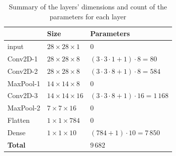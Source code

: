 \documentclass[compsoc]{IEEEtran}
\begin{document}
\begin{table}[ht!]
\begin{tabular}{|ll|l|}
\hline
\rowcolor[HTML]{3166FF} 
\multicolumn{1}{|l|}{\cellcolor[HTML]{3166FF}{\color[HTML]{FFFFFF} \textbf{Layer}}} & {\color[HTML]{FFFFFF} \textbf{Size}} & {\color[HTML]{FFFFFF} \textbf{Parameters}} \\ \hline
\multicolumn{1}{|l|}{input}                                                         & $28\times28\times1$                          &   $0$                                             \\ \hline
\multicolumn{1}{|l|}{Conv2D-1}                                                      & $28\times28\times8$                           &  $(3\cdot3\cdot1+1)\cdot8 = 80$                                            \\ \hline
\multicolumn{1}{|l|}{Conv2D-2}                                                      & $28\times28\times8$                            &  $(3\cdot3\cdot8 + 1)\cdot8 = 584$                                            \\ \hline
\multicolumn{1}{|l|}{MaxPool-1}                                                     & $14\times14\times8$                            &  $0$                                            \\ \hline
\multicolumn{1}{|l|}{Conv2D-3}                                                      & $14\times14\times16$                            & $(3\cdot3\cdot8 + 1)\cdot16 = 1\,168$                                            \\ \hline
\multicolumn{1}{|l|}{MaxPool-2}                                                      & $7\times7\times16$                            & $0$                                            \\ \hline
\multicolumn{1}{|l|}{Flatten}                                                       & $1\times1\times784$                            & $0$                                            \\ \hline
\multicolumn{1}{|l|}{Dense}                                                         & $1\times1\times10$                            & $(784 + 1)\cdot10 = 7\,850$                                            \\ \hline
\multicolumn{2}{|l|}{\textbf{Total}}                                                                                       &       $9\,682$                                     \\ \hline
\end{tabular}
\caption{Summary of the layers' dimensions and count of the parameters for each layer}
\label{tab:count}
\end{table}
\end{document}
